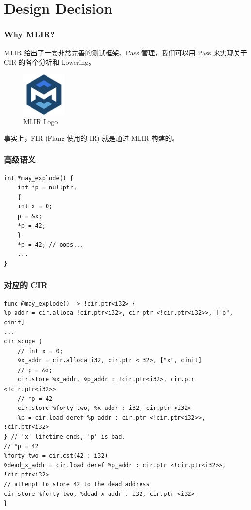 \section{Design Decision}

\begin{frame}
    \frametitle{Why MLIR?}

    MLIR 给出了一套非常完善的测试框架、Pass 管理，我们可以用 Pass 来实现关于
    CIR 的各个分析和 Lowering。

    \begin{figure}
        \centering
        \includegraphics[width=0.2\textwidth]{images/mlir-logo.png}
        \caption{MLIR Logo}
    \end{figure}

    事实上，FIR (Flang 使用的 IR) 就是通过 MLIR 构建的。

\end{frame}


\begin{frame}[fragile]
    \frametitle{高级语义}
    \begin{center}
        \begin{minipage}{0.5\textwidth}
            \begin{lstlisting}[caption=一个简单的生命周期分析例子]
int *may_explode() {
    int *p = nullptr;
    {
    int x = 0;
    p = &x;
    *p = 42;
    }
    *p = 42; // oops...
    ...
}
            \end{lstlisting}
        \end{minipage}
    \end{center}

\end{frame}

\begin{frame}[fragile]
    \frametitle{对应的 CIR}
    \begin{center}
        \begin{minipage}{1.0\textwidth}
            \begin{lstlisting}
func @may_explode() -> !cir.ptr<i32> {
%p_addr = cir.alloca !cir.ptr<i32>, cir.ptr <!cir.ptr<i32>>, ["p", cinit]
...
cir.scope {
    // int x = 0;
    %x_addr = cir.alloca i32, cir.ptr <i32>, ["x", cinit]
    // p = &x;
    cir.store %x_addr, %p_addr : !cir.ptr<i32>, cir.ptr <!cir.ptr<i32>>
    // *p = 42
    cir.store %forty_two, %x_addr : i32, cir.ptr <i32>
    %p = cir.load deref %p_addr : cir.ptr <!cir.ptr<i32>>, !cir.ptr<i32>
} // 'x' lifetime ends, 'p' is bad.
// *p = 42
%forty_two = cir.cst(42 : i32)
%dead_x_addr = cir.load deref %p_addr : cir.ptr <!cir.ptr<i32>>, !cir.ptr<i32>
// attempt to store 42 to the dead address
cir.store %forty_two, %dead_x_addr : i32, cir.ptr <i32>
}
            \end{lstlisting}
        \end{minipage}
    \end{center}

\end{frame}
